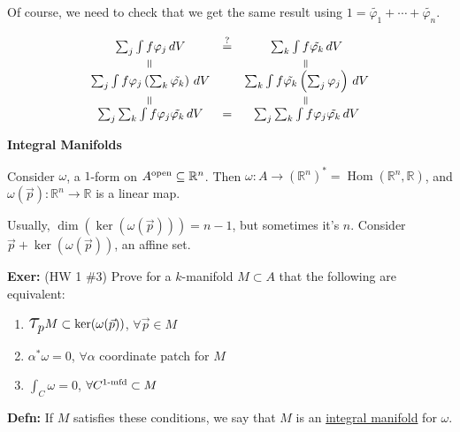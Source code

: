 \documentclass[10pt,letterpaper]{article}
\newcommand{\n}{\hfill\break}
\newcommand{\up}{\vspace{-\baselineskip}}
\newcommand{\defn}[1]{\par\noindent\settowidth{\hangindent}{\textbf{Defn: }}\textbf{Defn: }#1\n}
\newcommand{\exer}[1]{\par\noindent\settowidth{\hangindent}{\textbf{Exer: }}\textbf{Exer: }#1\n}
\newcommand{\ptxt}[1]{\textrm{\textnormal{#1}}}
\newcommand{\reals}{\mathbb{R}}
\newcommand{\R}{\reals}
\DeclareMathOperator{\Hom}{Hom}
\newcommand{\eqVertical}{\rotatebox[origin=c]{90}{=}}
\newcommand{\Tau}{\mathlarger{\mathlarger{\mathlarger{\mathlarger{\tau}}}}}
\newcommand{\paren}[1]{\left(#1\right)}
\begin{document}
\par\noindent Of course, we need to check that we get the same result using $1=\tilde{\varphi_{1}}+\cdots+\tilde{\varphi_{n}}$.

\[
\begin{array}{ccccc}
\sum_{j}\int{}f\varphi_{j}\,dV & \overset{\ptxt{?}}{=} & \sum_{k}\int{}f\tilde{\varphi_{k}}\,dV\\
\eqVertical & & \eqVertical\\
\sum_{j}\int{}f\varphi_{j}\paren{\sum_{k}\tilde{\varphi_{k}}}\,dV & & \sum_{k}\int{}f\tilde{\varphi_{k}}\paren{\sum_{j}\varphi_{j}}\,dV\\
\eqVertical & & \eqVertical\\
\sum_{j}\sum_{k}\int{}f\varphi_{j}\tilde{\varphi_{k}}\,dV & = & \sum_{j}\sum_{k}\int{}f\varphi_{j}\tilde{\varphi_{k}}\,dV
\end{array}
\]

\newpage

\par\noindent\textbf{Integral Manifolds}\n

\par\noindent Consider $\omega$, a $1$-form on $A^{\ptxt{open}}\subseteq\R^{n}$.\n
Then $\omega:A\to\paren{\R^{n}}^{*}=\Hom(\R^{n},\R)$, and $\omega(\vec{p}):\R^{n}\to\R$ is a linear map.\n

\par\noindent Usually, $\dim(\ker(\omega(\vec{p})))=n-1$, but sometimes it's $n$. Consider $\vec{p}+\ker(\omega(\vec{p}))$, an affine set.\n

\exer{(HW 1 \#3) Prove for a $k$-manifold $M\subset{}A$ that the following are equivalent:
\begin{enumerate}[label=(\alph*)]
	\item $\Tau_{p}M\subset\ker(\omega(\vec{p}))$, $\forall\vec{p}\in{}M$
	\item $\alpha^{*}\omega=0$, $\forall\alpha$ coordinate patch for $M$
	\item $\int_{C}\omega=0$, $\forall{}C^{1\ptxt{-mfd}}\subset{}M$
\end{enumerate}}

\up\defn{If $M$ satisfies these conditions, we say that $M$ is an \underline{integral manifold} for $\omega$.}
\end{document}
